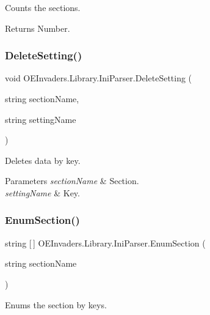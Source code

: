 Counts the sections. 

\begin{DoxyReturn}{Returns}
Number.
\end{DoxyReturn}
\mbox{\label{class_o_e_invaders_1_1_library_1_1_ini_parser_a789776fe8a8eb9ba0f705a5f450799fd}} 
\subsubsection{\texorpdfstring{DeleteSetting()}{DeleteSetting()}}
{\footnotesize\ttfamily void O\+E\+Invaders.\+Library.\+Ini\+Parser.\+Delete\+Setting (\begin{DoxyParamCaption}\item[{string}]{section\+Name,  }\item[{string}]{setting\+Name }\end{DoxyParamCaption})}



Deletes data by key. 


\begin{DoxyParams}{Parameters}
{\em section\+Name} & Section.\\
\hline
{\em setting\+Name} & Key.\\
\hline
\end{DoxyParams}
\mbox{\label{class_o_e_invaders_1_1_library_1_1_ini_parser_a0d07d9af2cb34c65805965760f9da3b2}} 
\subsubsection{\texorpdfstring{EnumSection()}{EnumSection()}}
{\footnotesize\ttfamily string \mbox{[}$\,$\mbox{]} O\+E\+Invaders.\+Library.\+Ini\+Parser.\+Enum\+Section (\begin{DoxyParamCaption}\item[{string}]{section\+Name }\end{DoxyParamCaption})}



Enums the section by keys. 


